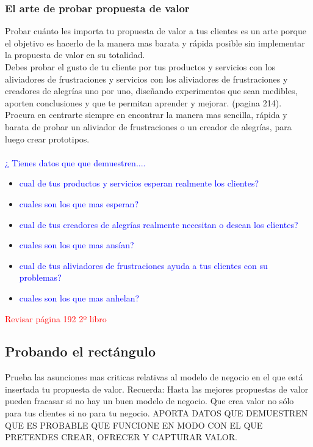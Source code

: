 \documentclass[11pt]{book}
\begin{document}
\subsubsection{El arte de probar propuesta de valor}
Probar cuánto les importa tu propuesta de valor a tus clientes es un arte porque el objetivo es hacerlo de la manera mas barata y rápida posible sin implementar la propuesta de valor en su totalidad.\\
Debes probar el gusto de tu cliente por tus productos y servicios con los aliviadores de frustraciones y servicios con los aliviadores de frustraciones y creadores de alegrías uno por uno, diseñando experimentos que sean medibles, aporten conclusiones y que te permitan aprender y mejorar. (pagina 214). Procura en centrarte siempre en encontrar la manera mas sencilla, rápida y barata de probar un aliviador de frustraciones o un creador de alegrías, para luego crear prototipos.\\\\
\textcolor{blue}{¿ Tienes datos que que demuestren.... }
\begin{itemize}
\item \textcolor{blue}{ cual de tus productos y servicios esperan realmente los clientes? }
\item \textcolor{blue}{ cuales son los que mas esperan? }
\item \textcolor{blue}{ cual de tus creadores de alegrías realmente necesitan o desean los clientes? }
\item \textcolor{blue}{ cuales son los que mas ansían? }
\item \textcolor{blue}{ cual de tus aliviadores de frustraciones ayuda a tus clientes con su problemas? }
\item \textcolor{blue}{ cuales son los que mas anhelan? }
\end{itemize}
\textcolor{red}{ Revisar página 192 2º libro }
\subsection{Probando el rectángulo}
Prueba las asunciones mas criticas relativas al modelo de negocio en el que está insertada tu propuesta de valor. Recuerda: Hasta las mejores propuestas de valor pueden fracasar si no hay un buen modelo de negocio. Que crea valor no sólo para tus clientes si no para tu negocio.
APORTA DATOS QUE DEMUESTREN QUE ES PROBABLE QUE FUNCIONE EN MODO CON EL QUE PRETENDES CREAR, OFRECER Y CAPTURAR VALOR.
\end{document}
